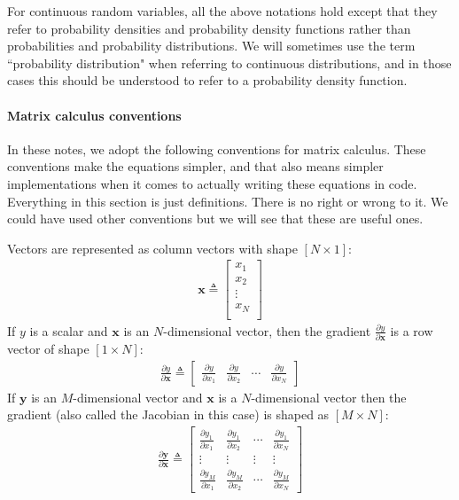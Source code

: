 \documentclass[12pt,letterpaper]{article}
\begin{document}
For continuous random variables, all the above notations hold except that they refer to probability densities and probability density functions rather than probabilities and probability distributions. We will sometimes use the term ``probability distribution" when referring to continuous distributions, and in those cases this should be understood to refer to a probability density function.

\paragraph{Matrix calculus conventions}

In these notes, we adopt the following conventions for matrix calculus. These conventions make the equations simpler, and that also means simpler implementations when it comes to actually writing these equations in code. Everything in this section is just definitions. There is no right or wrong to it. We could have used other conventions but we will see that these are useful ones.

Vectors are represented as column vectors with shape $[N \times 1]$:
\begin{align}
    \mathbf{x} \triangleq 
    \begin{bmatrix}
    x_1  \\
    x_2  \\
    \vdots \\
    x_N \\
    \end{bmatrix}
\end{align}
If $y$ is a scalar and $\mathbf{x}$ is an $N$-dimensional vector, then the gradient $\frac{\partial y}{\partial \mathbf{x}}$ is a row vector of shape  $[1 \times N]$:
\begin{align}
    \frac{\partial y}{\partial \mathbf{x}} \triangleq  
\begin{bmatrix}
    \frac{\partial y}{\partial x_1} & \frac{\partial y}{\partial x_2} & \cdots & \frac{\partial y}{\partial x_N} \label{backprop:scalar_vector_deriv}
\end{bmatrix}
\end{align}
If $\mathbf{y}$ is an $M$-dimensional vector and $\mathbf{x}$ is a $N$-dimensional vector then the gradient (also called the Jacobian in this case) is shaped as $[M \times N]$:
\begin{align}
\frac{\partial \mathbf{y}}{\partial \mathbf{x}} \triangleq  
\begin{bmatrix}
    \frac{\partial y_1}{\partial x_1} & \frac{\partial y_1}{\partial x_2} & \cdots & \frac{\partial y_1}{\partial x_N} \\
    \vdots & \vdots & \vdots & \vdots \\
    \frac{\partial y_M}{\partial x_1} & \frac{\partial y_M}{\partial x_2} & \cdots & \frac{\partial y_M}{\partial x_N}
\end{bmatrix}
\end{align}
\end{document}

